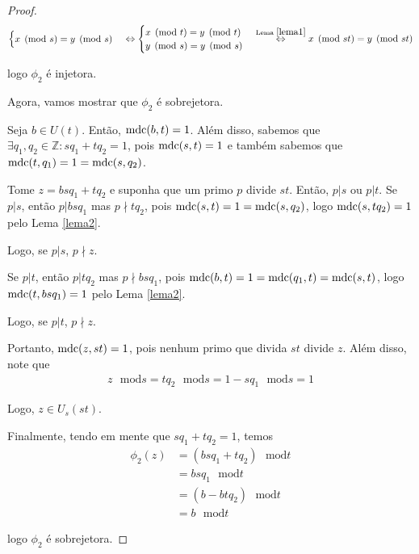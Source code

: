 \begin{proof}
\begin{align*}
\begin{cases}
		x\pmod s = y\pmod s
		\end{cases}\Leftrightarrow
		\begin{cases}
		x\pmod t = y\pmod t \\
		y\pmod s = y\pmod s
		\end{cases} \overset{\text{Lema } \eqref{lema1}}{\Leftrightarrow } x\pmod {st} = y\pmod{st} 
		\end{align*}
		\par\vspace{0.3cm}logo $\phi_2$ é injetora. 
		\par\vspace{0.3cm} Agora, vamos mostrar que $\phi_2$ é sobrejetora.
		\par\vspace{0.3cm} Seja $b\in U(t)$. Então, $\operatorname{mdc}(b,t) = 1$. Além disso, sabemos que $\exists q_1, q_2\in\mathbb{Z}: sq_1 + tq_2 = 1$, pois $\operatorname{mdc}(s,t) = 1$ e também sabemos que $\operatorname{mdc}(t,q_1) = 1 = \operatorname{mdc}(s, q_2)$. 
		\par\vspace{0.3cm} Tome $z = bsq_1 + tq_2$ e suponha que um primo $p$ divide $st$. Então, $p|s$ ou $p|t$. Se $p|s$, então $p|bsq_1$ mas $p\nmid tq_2$, pois $\operatorname{mdc}(s,t) = 1 = \operatorname{mdc}(s,q_2)$, logo $\operatorname{mdc}(s, tq_2) = 1$ pelo Lema \eqref{lema2}. 
		\par\vspace{0.3cm} Logo, se $p|s$, $p\nmid z$.
		\par\vspace{0.3cm} Se $p|t$, então $p|tq_2$ mas $p\nmid bsq_1$, pois $\operatorname{mdc}(b,t) = 1 = \operatorname{mdc}(q_1, t) = \operatorname{mdc}(s,t)$, logo $\operatorname{mdc}(t, bsq_1) = 1$ pelo Lema \eqref{lema2}.
		\par\vspace{0.3cm} Logo, se $p|t$, $p\nmid z$.
		\par\vspace{0.3cm} Portanto, $\operatorname{mdc}(z, st) = 1$, pois nenhum primo que divida $st$ divide $z$. Além disso, note que 
		\begin{align*}
		z\text{ }\mathrm{mod} s = tq_2\text{ }\mathrm{mod} s = 1 - sq_1 \text{ }\mathrm{mod} s = 1
		\end{align*} 
		\par\vspace{0.3cm} Logo, $z\in U_s(st)$. 
		\par\vspace{0.3cm} Finalmente, tendo em mente que $sq_1 + tq_2 = 1$, temos
		\begin{align*}
		\phi_2(z) &= (bsq_1 + tq_2)\text{ }\mathrm{mod} t \\ &= bsq_1\text{ }\mathrm{mod} t \\ &= (b - btq_2)\text{ }\mathrm{mod} t \\ &= b\text{ }\mathrm{mod} t
		\end{align*}
		\par\vspace{0.3cm}logo $\phi_2$ é sobrejetora.
		

\end{proof}
